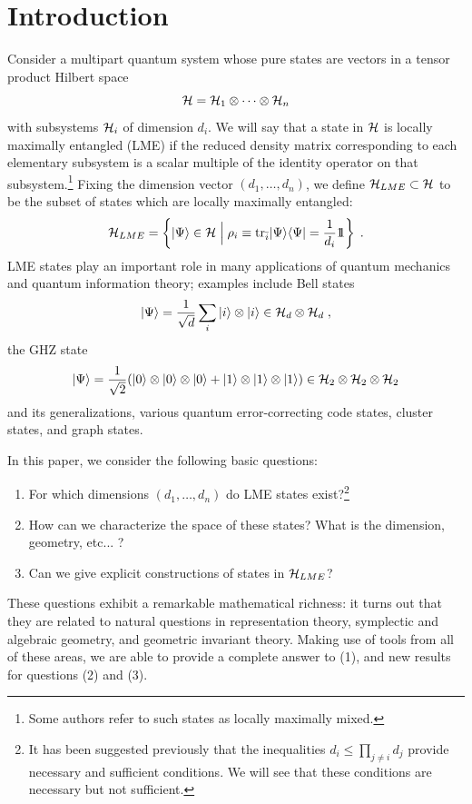 \documentclass[12pt]{article}
\theoremstyle{definition}
\newcommand{\be}{\begin{equation}}
\newcommand{\ee}{\end{equation}}
\def\identity{{\rlap{1} \hskip 1.6pt \hbox{1}}}
\newcommand{\tr}{{\rm tr}}
\begin{document}
\section{Introduction}

Consider a multipart quantum system whose pure states are vectors in a tensor product Hilbert space
\[
{\cal H} = {\cal H}_{1} \otimes \cdots \otimes {\cal H}_{n} 
\]
with subsystems ${\cal H}_i$ of dimension $d_i$. We will say that a state in ${\cal H}$ is locally maximally entangled (LME) if the reduced density matrix corresponding to each elementary subsystem is a scalar multiple of the identity operator on that subsystem.\footnote{Some authors refer to such states as locally maximally mixed.}
Fixing the dimension vector $(d_1,\dots,d_n)$, we define ${\cal H}_{LME} \subset {\cal H}$ to be the subset of states which are locally maximally entangled:
\be
{\cal H}_{LME} = \left\{|\Psi \rangle \in {\cal H} \; \Big| \; \rho_i \equiv \tr_{\bar{i}}|\Psi \rangle \langle \Psi | = {1 \over d_i} \identity \right\}\; .
\ee
LME states play an important role in many applications of quantum mechanics and quantum information theory; examples include Bell states
\be
\label{Bell}
|\Psi \rangle = {1 \over \sqrt{d}} \sum_{i} |i \rangle \otimes |i \rangle \in {\cal H}_d \otimes {\cal H}_d \; ,
\ee
the GHZ state
\be
\label{GHZ}
|\Psi \rangle = {1 \over \sqrt{2}} (|0 \rangle \otimes |0 \rangle \otimes |0 \rangle  + |1 \rangle \otimes |1 \rangle \otimes |1 \rangle) \in {\cal H}_2 \otimes {\cal H}_2 \otimes {\cal H}_2
\ee
and its generalizations, various quantum error-correcting code states, cluster states, and graph states.

In this paper, we consider the following basic questions:
\begin{enumerate}
\item
For which dimensions $(d_1,\dots,d_n)$ do LME states exist?\footnote{It has been suggested previously that the inequalities $d_i \le \prod_{j \ne i} d_j$ provide necessary and sufficient conditions. We will see that these conditions are necessary but not sufficient.}
\item
How can we characterize the space of these states? What is the dimension, geometry, etc... ?
\item
Can we give explicit constructions of states in ${\cal H}_{LME}$?
\end{enumerate}
These questions exhibit a remarkable mathematical richness: it turns out that they are related to natural questions in representation theory, symplectic and algebraic geometry, and geometric invariant theory. Making use of tools from all of these areas, we are able to provide a complete answer to (1), and new results for questions (2) and (3).
\end{document}
